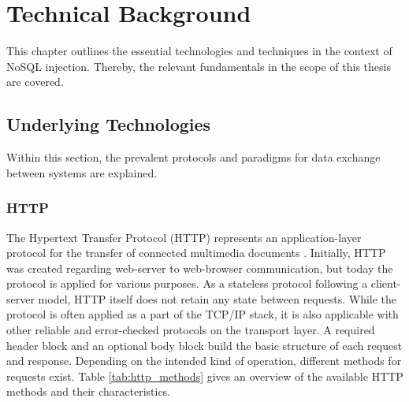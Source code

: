  \chapter{Technical Background}
\label{cha:technicalBackground}
This chapter outlines the essential technologies and techniques in the context of NoSQL injection. Thereby, the relevant fundamentals in the scope of this thesis are covered.

\section{Underlying Technologies}
Within this section, the prevalent protocols and paradigms for data exchange between systems are explained.

\subsection{HTTP}
The Hypertext Transfer Protocol (HTTP) represents an application-layer protocol for the transfer of connected multimedia documents \cite{Berners-Lee1996}\cite{Fielding:1999}. Initially, HTTP was created regarding web-server to web-browser communication, but today the protocol is applied for various purposes. As a stateless protocol following a client-server model, HTTP itself does not retain any state between requests. While the protocol is often applied as a part of the TCP/IP stack, it is also applicable with other reliable and error-checked protocols on the transport layer. A required header block and an optional body block build the basic structure of each request and response. Depending on the intended kind of operation, different methods for requests exist. Table \ref{tab:http_methods} gives an overview of the available HTTP methods and their characteristics.\\

